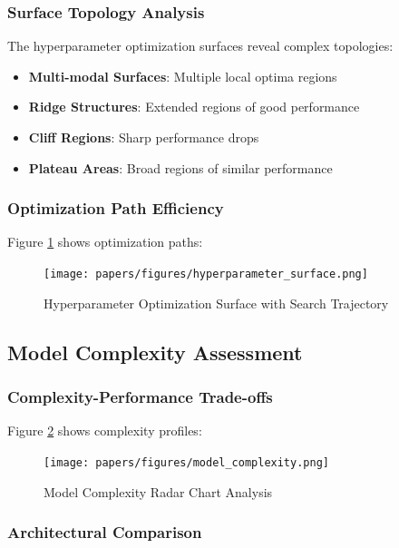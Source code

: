 \documentclass[12pt,a4paper]{article}
\begin{document}
\subsubsection{Surface Topology Analysis}

The hyperparameter optimization surfaces reveal complex topologies:

\begin{itemize}
    \item \textbf{Multi-modal Surfaces}: Multiple local optima regions
    \item \textbf{Ridge Structures}: Extended regions of good performance
    \item \textbf{Cliff Regions}: Sharp performance drops
    \item \textbf{Plateau Areas}: Broad regions of similar performance
\end{itemize}

\subsubsection{Optimization Path Efficiency}

Figure \ref{fig:hyperparameter-surface} shows optimization paths:

\begin{figure}[H]
\centering
\texttt{[image: papers/figures/hyperparameter\_surface.png]}
\caption{Hyperparameter Optimization Surface with Search Trajectory}
\label{fig:hyperparameter-surface}
\end{figure}

\subsection{Model Complexity Assessment}

\subsubsection{Complexity-Performance Trade-offs}

Figure \ref{fig:complexity-analysis} shows complexity profiles:

\begin{figure}[H]
\centering
\texttt{[image: papers/figures/model\_complexity.png]}
\caption{Model Complexity Radar Chart Analysis}
\label{fig:complexity-analysis}
\end{figure}

\subsubsection{Architectural Comparison}
\end{document}
